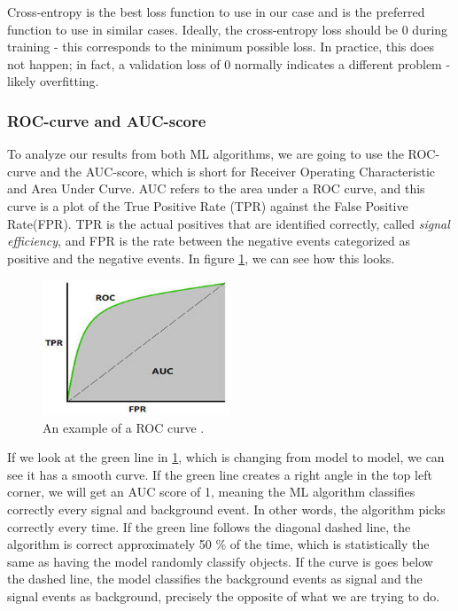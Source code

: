 Cross-entropy is the best loss function to use in our case and is the preferred function to use in similar cases. Ideally, the cross-entropy loss should be 0 during training - this corresponds to the minimum possible loss. In practice, this does not happen; in fact, a validation loss of 0 normally indicates a different problem  - likely overfitting. 


\subsubsection{ROC-curve and AUC-score}
To analyze our results from both ML algorithms, we are going to use the ROC-curve and the AUC-score, which is short for Receiver Operating Characteristic and Area Under Curve. AUC refers to the area under a ROC curve, and this curve is a plot of the True Positive Rate (TPR) against the False Positive Rate(FPR). TPR is the actual positives that are identified correctly, called \textit{signal efficiency}, and FPR is the rate between the negative events categorized as positive and the negative events. In figure \ref{fig:ROCAUCex}, we can see how this looks. 

\begin{figure}[H]
    \centering
    \includegraphics[width = 0.5\textwidth]{Figures/FromOnline/ROCAUC.jpg}
    \caption{An example of a ROC curve \cite{ROCAUC}.}
    \label{fig:ROCAUCex}
\end{figure}

If we look at the green line in \ref{fig:ROCAUCex}, which is changing from model to model, we can see it has a smooth curve. If the green line creates a right angle in the top left corner, we will get an AUC score of 1, meaning the ML algorithm classifies correctly every signal and background event. In other words, the algorithm picks correctly every time. If the green line follows the diagonal dashed line, the algorithm is correct approximately 50 \% of the time, which is statistically the same as having the model randomly classify objects. If the curve is goes below the dashed line, the model classifies the background events as signal and the signal events as background, precisely the opposite of what we are trying to do. 










